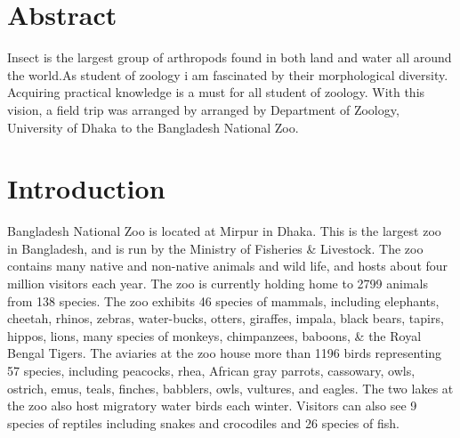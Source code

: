\documentclass[a4paper, 12pt]{article}
\begin{document}
\section{Abstract}
Insect is the largest group of arthropods found in both land and water all around the world.As student of zoology i am fascinated by their morphological diversity. Acquiring practical knowledge is a must for all student of zoology. With this vision, a field trip was arranged by arranged by Department of Zoology, University of Dhaka to the Bangladesh National Zoo.
\section{Introduction}
Bangladesh National Zoo is located at Mirpur in Dhaka. This is the largest zoo in Bangladesh, and is run by the Ministry of Fisheries \& Livestock. The zoo contains many native and non-native animals and wild life, and hosts about four million visitors each year. The zoo is currently holding home to 2799 animals from 138 species. The zoo exhibits 46 species of mammals, including elephants, cheetah, rhinos, zebras, water-bucks, otters, giraffes, impala, black bears, tapirs, hippos, lions, many species of monkeys, chimpanzees, baboons, \& the Royal Bengal Tigers. The aviaries at the zoo house more than 1196 birds representing 57 species, including peacocks, rhea, African gray parrots, cassowary, owls, ostrich, emus, teals, finches, babblers, owls, vultures, and
eagles. The two lakes at the zoo also host migratory water birds each winter. Visitors can also see 9 species of reptiles including snakes and crocodiles and 26 species of fish.
\end{document}
